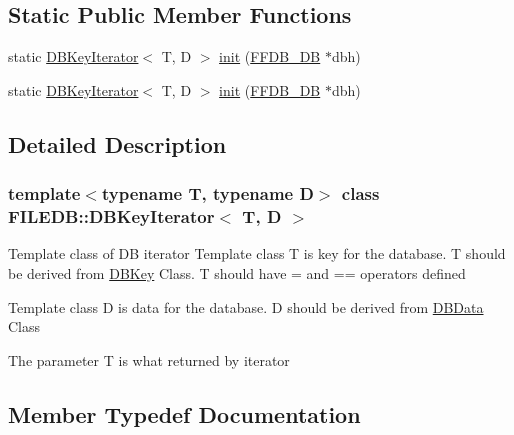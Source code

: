 \subsection*{Static Public Member Functions}
\begin{DoxyCompactItemize}
\item 
static \mbox{\hyperlink{classFILEDB_1_1DBKeyIterator}{D\+B\+Key\+Iterator}}$<$ T, D $>$ \mbox{\hyperlink{classFILEDB_1_1DBKeyIterator_af4a5e1eaeb6e5c491c5894f3e70f893c}{init}} (\mbox{\hyperlink{other__libs_2filedb_2filehash_2ffdb__db_8h_a0b27b956926453a7a8141ea8e10f0df8}{F\+F\+D\+B\+\_\+\+DB}} $\ast$dbh)
\item 
static \mbox{\hyperlink{classFILEDB_1_1DBKeyIterator}{D\+B\+Key\+Iterator}}$<$ T, D $>$ \mbox{\hyperlink{classFILEDB_1_1DBKeyIterator_af4a5e1eaeb6e5c491c5894f3e70f893c}{init}} (\mbox{\hyperlink{other__libs_2filedb_2filehash_2ffdb__db_8h_a0b27b956926453a7a8141ea8e10f0df8}{F\+F\+D\+B\+\_\+\+DB}} $\ast$dbh)
\end{DoxyCompactItemize}


\subsection{Detailed Description}
\subsubsection*{template$<$typename T, typename D$>$\newline
class F\+I\+L\+E\+D\+B\+::\+D\+B\+Key\+Iterator$<$ T, D $>$}

Template class of DB iterator Template class T is key for the database. T should be derived from \mbox{\hyperlink{classFILEDB_1_1DBKey}{D\+B\+Key}} Class. T should have = and == operators defined

Template class D is data for the database. D should be derived from \mbox{\hyperlink{classFILEDB_1_1DBData}{D\+B\+Data}} Class

The parameter T is what returned by iterator 

\subsection{Member Typedef Documentation}
\mbox{\label{classFILEDB_1_1DBKeyIterator_aaf7773c7a848ec6e04bc738dd794ace1}} 

